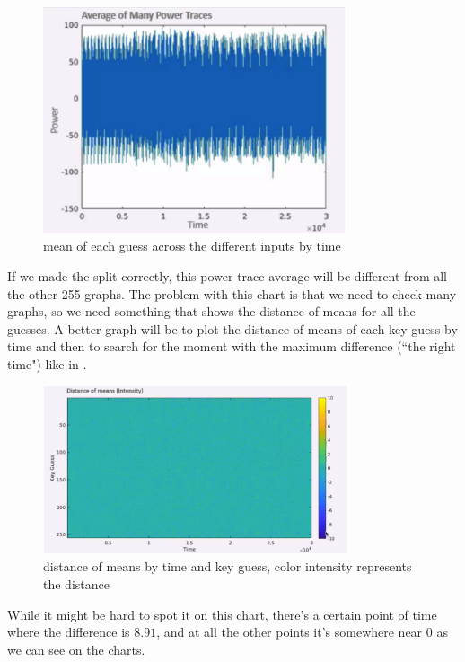\begin{figure}[!ht]
    \centering
    \includegraphics[width=0.8\textwidth]{images/Lecture6/avg_of_many_traces.png}
    \caption{mean of each guess across the different inputs by time} \label{fig:avg_of_many_traces}
\end{figure}

If we made the split correctly, this power trace average will be different from
all the other 255 graphs. The problem with this chart is that we need to check
many graphs, so we need something that shows the distance of means for all the
guesses. A better graph will be to plot the distance of means of each key guess
by time and then to search for the moment with the maximum difference (``the
right time") like in .

\begin{figure}[!ht]
    \centering
    \includegraphics[width=0.8\textwidth]{images/Lecture6/intensity_represents_means_diff.png}
    \caption{distance of means by time and key guess, color intensity represents the distance} \label{fig:intensity_represents_means_diff}
\end{figure}

While it might be hard to spot it on this chart, there's a certain point of time
where the difference is $8.91$, and at all the other points it's somewhere near
0 as we can see on the charts.

